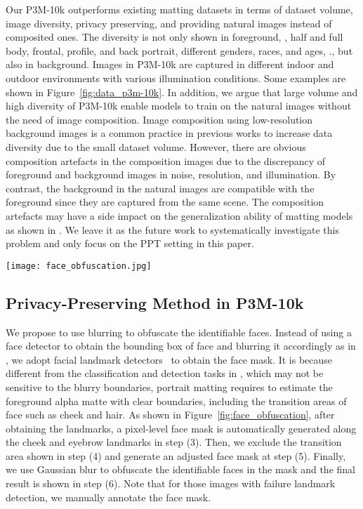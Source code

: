 \documentclass[sigconf]{acmart}
\begin{document}
Our P3M-10k outperforms existing matting datasets in terms of dataset volume, image diversity, privacy preserving, and providing natural images instead of composited ones. The diversity is not only shown in foreground, , half and full body, frontal, profile, and back portrait, different genders, races, and ages, ., but also in background. Images in P3M-10k are captured in different indoor and outdoor environments with various illumination conditions. Some examples are shown in Figure~\ref{fig:data_p3m-10k}. In addition, we argue that large volume and high diversity of P3M-10k enable models to train on the natural images without the need of image composition. Image composition using low-resolution background images is a common practice in previous works \cite{dim, hatt} to increase data diversity due to the small dataset volume. However, there are obvious composition artefacts in the composition images due to the discrepancy of foreground and background images in noise, resolution, and illumination. By contrast, the background in the natural images are compatible with the foreground since they are captured from the same scene. The composition artefacts may have a side impact on the generalization ability of matting models as shown in \cite{gfm}. We leave it as the future work to systematically investigate this problem and only focus on the PPT setting in this paper. 

\begin{figure*}
    \centering
    \texttt{[image: face\_obfuscation.jpg]}
    \caption{Illustration of the face blurring process.}
    \label{fig:face_obfuscation}
\end{figure*}

\subsection{Privacy-Preserving Method in P3M-10k}
We propose to use blurring to obfuscate the identifiable faces. Instead of using a face detector to obtain the bounding box of face and blurring it accordingly as in \cite{yang2021study}, we adopt facial landmark detectors~\cite{bulat2017far, zhang2021towards} to obtain the face mask. It is because different from the classification and detection tasks in \cite{yang2021study}, which may not be sensitive to the blurry boundaries, portrait matting requires to estimate the foreground alpha matte with clear boundaries, including the transition areas of face such as cheek and hair. As shown in Figure~\ref{fig:face_obfuscation}, after obtaining the landmarks, a pixel-level face mask is automatically generated along the cheek and eyebrow landmarks in step (3). Then, we exclude the transition area shown in step (4) and generate an adjusted face mask at step (5). Finally, we use Gaussian blur to obfuscate the identifiable faces in the mask and the final result is shown in step (6). Note that for those images with failure landmark detection, we manually annotate the face mask.
\end{document}
